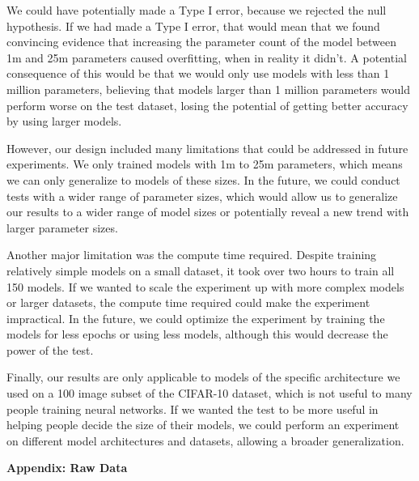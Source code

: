 \documentclass[12pt]{article}
\begin{document}
    We could have potentially made a Type I error, because we rejected the null hypothesis. If we had made a Type I error,
    that would mean that we found convincing evidence that increasing the parameter count of the model between 1m and 25m parameters
    caused overfitting, when in reality it didn't. A potential consequence of this would be that we would only use models with less than 1 million parameters,
    believing that models larger than 1 million parameters would perform worse on the test dataset, losing the potential
    of getting better accuracy by using larger models.

    However, our design included many limitations that could be addressed in future experiments.
    We only trained models with 1m to 25m parameters, which means we can only generalize to models of these sizes.
    In the future, we could conduct tests with a wider range of parameter sizes, which would allow us to generalize our results to a wider range of model sizes or potentially reveal a new trend with larger parameter sizes.

    Another major limitation was the compute time required. Despite training relatively simple models on a small dataset, it took over two hours to train all 150 models.
    If we wanted to scale the experiment up with more complex models or larger datasets, the compute time required could make the experiment impractical.
    In the future, we could optimize the experiment by training the models for less epochs or using less models, although this would decrease the power of the test.

    Finally, our results are only applicable to models of the specific architecture we used on a 100 image subset of the CIFAR-10 dataset, which is not useful to many people training neural networks.
    If we wanted the test to be more useful in helping people decide the size of their models, we could perform an experiment on different model architectures and datasets, allowing a broader generalization.



    \clearpage
    \appendix
    \textbf{Appendix: Raw Data}
\end{document}
